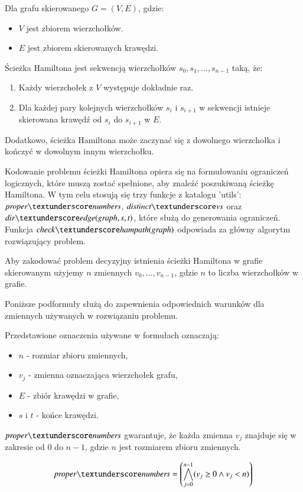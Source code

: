 Dla grafu skierowanego $G = (V, E)$, gdzie:
\begin{itemize}
	\item \(V\) jest zbiorem wierzchołków.
	\item \(E\) jest zbiorem skierowanych krawędzi.
\end{itemize}
Ścieżka Hamiltona jest sekwencją wierzchołków $s_0, s_1, …, s_{n-1}$ taką, że:
\begin{enumerate}
	\item Każdy wierzchołek z \(V\) występuje dokładnie raz.
	\item Dla każdej pary kolejnych wierzchołków \(s_i\) i \(s_{i+1}\) w sekwencji istnieje skierowana krawędź od \(s_i\) do \(s_{i+1}\) w \(E\). 
\end{enumerate}

Dodatkowo, ścieżka Hamiltona może zaczynać się z dowolnego wierzchołka i kończyć w dowolnym innym wierzchołku.

Kodowanie problemu ścieżki Hamiltona opiera się na formułowaniu ograniczeń logicznych, które muszą zostać spełnione, aby znaleźć poszukiwaną ścieżkę Hamiltona. W tym celu stosują się trzy funkcje z katalogu 'utils': $\propernumbers$, $\distinctvs$ oraz $\diredge$, które służą do generowania ograniczeń. Funkcja $\checkhampath$ odpowiada za główny algorytm rozwiązujący problem.

Aby zakodować problem decyzyjny istnienia ścieżki Hamiltona w grafie skierowanym użyjemy $n$ zmiennych $v_0,\ldots,v_{n-1}$, gdzie $n$ to liczba wierzchołków w grafie.

Poniższe podformuły służą do zapewnienia odpowiednich warunków dla zmiennych używanych w rozwiązaniu problemu.

Przedstawione oznaczenia używane w formułach oznaczają:
\begin{itemize}
	\item \(n\) - rozmiar zbioru zmiennych, 
	\item \(v_j\) - zmienna oznaczająca wierzchołek grafu,
	\item \(E\) - zbiór krawędzi w grafie,
	\item \(s\) i \(t\) - końce krawędzi.
\end{itemize}

$\propernumbers$ gwarantuje, że każda zmienna \(v_j\) znajduje się w zakresie od \(0\) do $n − 1$, gdzie \(n\) jest rozmiarem zbioru zmiennych.

\begin{align*}
	\propernumbers = \left( \bigwedge_{j=0}^{n-1} (v_j \geq 0 \land v_j < n) \right) 
\end{align*}

